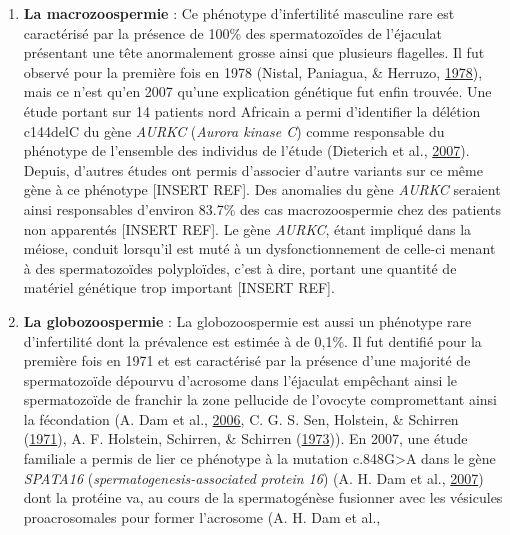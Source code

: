 \documentclass[12pt,twoside]{reedthesis}
\providecommand{\tightlist}{%
  \setlength{\itemsep}{0pt}\setlength{\parskip}{0pt}}
\theoremstyle{definition}
\theoremstyle{definition}
\theoremstyle{remark}
\begin{document}
\begin{enumerate}
    \begin{enumerate}
    \def\labelenumii{\alph{enumii}.}
    \tightlist
    \item
      \textbf{La macrozoospermie} : Ce phénotype d'infertilité masculine
      rare est caractérisé par la présence de 100\% des spermatozoïdes de
      l'éjaculat présentant une tête anormalement grosse ainsi que
      plusieurs flagelles. Il fut observé pour la première fois en 1978
      (Nistal, Paniagua, \& Herruzo,
      \protect\hyperlink{ref-Nistal}{1978}), mais ce n'est qu'en 2007
      qu'une explication génétique fut enfin trouvée. Une étude portant
      sur 14 patients nord Africain a permi d'identifier la délétion
      c144delC du gène \emph{AURKC} (\emph{Aurora kinase C}) comme
      responsable du phénotype de l'ensemble des individus de l'étude
      (Dieterich et al., \protect\hyperlink{ref-Dieterich2007}{2007}).
      Depuis, d'autres études ont permis d'associer d'autre variants sur
      ce même gène à ce phénotype {[}INSERT REF{]}. Des anomalies du gène
      \emph{AURKC} seraient ainsi responsables d'environ 83.7\% des cas
      macrozoospermie chez des patients non apparentés {[}INSERT REF{]}.
      Le gène \emph{AURKC}, étant impliqué dans la méiose, conduit
      lorsqu'il est muté à un dysfonctionnement de celle-ci menant à des
      spermatozoïdes polyploïdes, c'est à dire, portant une quantité de
      matériel génétique trop important {[}INSERT REF{]}.\\
    \item
      \textbf{La globozoospermie} : La globozoospermie est aussi un
      phénotype rare d'infertilité dont la prévalence est estimée à de
      0,1\%. Il fut dentifié pour la première fois en 1971 et est
      caractérisé par la présence d'une majorité de spermatozoïde dépourvu
      d'acrosome dans l'éjaculat empêchant ainsi le spermatozoïde de
      franchir la zone pellucide de l'ovocyte compromettant ainsi la
      fécondation (A. Dam et al., \protect\hyperlink{ref-Dam2006}{2006},
      C. G. S. Sen, Holstein, \& Schirren
      (\protect\hyperlink{ref-Sen2009}{1971}), A. F. Holstein, Schirren,
      \& Schirren (\protect\hyperlink{ref-Holstein1973}{1973})). En 2007,
      une étude familiale a permis de lier ce phénotype à la mutation
      c.848G\textgreater{}A dans le gène \emph{SPATA16}
      (\emph{spermatogenesis-associated protein 16}) (A. H. Dam et al.,
      \protect\hyperlink{ref-Dam2007a}{2007}) dont la protéine va, au
      cours de la spermatogénèse fusionner avec les vésicules
      proacrosomales pour former l'acrosome (A. H. Dam et al.,

\end{enumerate}
\end{enumerate}
\end{document}

